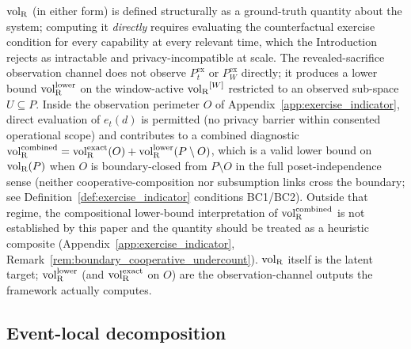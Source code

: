 \begin{remark}
\label{rem:volR_diagnostic}
${\operatorname{vol}_{\mathrm{R}}}$ (in either form) is defined structurally as a
ground-truth quantity about the system; computing it
\emph{directly} requires evaluating the counterfactual exercise
condition for every capability at every relevant time, which the
Introduction rejects as intractable and privacy-incompatible at
scale.  The revealed-sacrifice observation channel does not
observe $P^{\mathrm{ex}}_t$ or $P^{\mathrm{ex}}_W$ directly; it
produces a lower bound ${\operatorname{vol}_{\mathrm{R}}^{\mathrm{lower}}}$ on the window-active
${\operatorname{vol}_{\mathrm{R}}}^{[W]}$ restricted to an observed sub-space
$U \subseteq P$.  Inside the observation perimeter $O$ of
Appendix~\ref{app:exercise_indicator}, direct evaluation of
$e_t(d)$ is permitted (no privacy barrier within consented
operational scope) and contributes to a combined diagnostic
${\operatorname{vol}_{\mathrm{R}}^{\mathrm{combined}}} = {\operatorname{vol}_{\mathrm{R}}^{\mathrm{exact}}}(O) + {\operatorname{vol}_{\mathrm{R}}^{\mathrm{lower}}}(P \setminus O)$, which
is a valid lower bound on ${\operatorname{vol}_{\mathrm{R}}}(P)$ when $O$ is
boundary-closed from $P \setminus O$ in the full
poset-independence sense (neither cooperative-composition nor
subsumption links cross the boundary; see
Definition~\ref{def:exercise_indicator} conditions BC1/BC2).
Outside that regime, the compositional lower-bound
interpretation of ${\operatorname{vol}_{\mathrm{R}}^{\mathrm{combined}}}$ is not established by this paper
and the quantity should be treated as a heuristic composite
(Appendix~\ref{app:exercise_indicator},
Remark~\ref{rem:boundary_cooperative_undercount}).  ${\operatorname{vol}_{\mathrm{R}}}$ itself is the
latent target; ${\operatorname{vol}_{\mathrm{R}}^{\mathrm{lower}}}$ (and ${\operatorname{vol}_{\mathrm{R}}^{\mathrm{exact}}}$ on $O$) are the
observation-channel outputs the framework actually computes.
\end{remark}

\subsection{Event-local decomposition}

